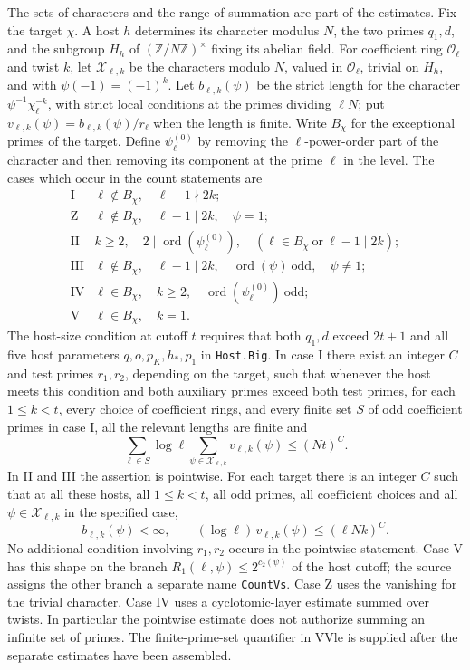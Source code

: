The sets of characters and the range of summation are part of the
estimates. Fix the target \(\chi\). A host \(h\) determines its character
modulus \(N\), the two primes \(q_1,d\), and the subgroup \(H_h\) of
\((\mathbb Z/N\mathbb Z)^\times\) fixing its abelian field.
For coefficient ring \(\mathcal O_\ell\) and twist \(k\), let
\(\mathcal X_{\ell,k}\) be the characters modulo \(N\), valued in
\(\mathcal O_\ell\), trivial on \(H_h\), and with
\(\psi(-1)=(-1)^k\). Let \(b_{\ell,k}(\psi)\) be the strict length for
the character \(\psi^{-1}\chi_\ell^{-k}\), with strict local conditions
at the primes dividing \(\ell N\); put
\(v_{\ell,k}(\psi)=b_{\ell,k}(\psi)/r_\ell\) when the length is finite.
Write \(B_\chi\) for the exceptional primes of the target. Define
\(\psi^{(0)}_\ell\) by removing the \(\ell\)-power-order part of the
character and then removing its component at the prime \(\ell\) in
the level. The cases which occur in the count statements are
\[
\begin{array}{cl}
\mathrm I&
 \ell\notin B_\chi,\quad \ell-1\nmid 2k;\\
\mathrm Z&
 \ell\notin B_\chi,\quad\ell-1\mid 2k,\quad\psi=1;\\
\mathrm {II}&
 k\ge2,\quad 2\mid\operatorname{ord}(\psi_\ell^{(0)}),\quad
    (\ell\in B_\chi\ \text{or}\ \ell-1\mid 2k);\\
\mathrm {III}&
 \ell\notin B_\chi,\quad\ell-1\mid 2k,\quad
   \operatorname{ord}(\psi)\ \text{odd},\quad\psi\ne1;\\
\mathrm {IV}&
 \ell\in B_\chi,\quad k\ge2,\quad
   \operatorname{ord}(\psi_\ell^{(0)})\ \text{odd};\\
\mathrm {V}&\ell\in B_\chi,\quad k=1.
\end{array}
\]
The host-size condition at cutoff \(t\) requires that both \(q_1,d\)
exceed \(2t+1\) and all five host parameters \(q,o,p_K,h_*,p_1\)
in \texttt{Host.\allowbreak{}Big}. In case I there exist an integer \(C\) and test
primes \(r_1,r_2\), depending on the target, such that whenever the
host meets this condition and both auxiliary primes exceed both test
primes, for each \(1\le k<t\), every choice of coefficient rings,
and every finite set \(S\) of odd coefficient primes in case I,
all the relevant lengths are finite and
\[
     \sum_{\ell\in S}\log\ell
             \sum_{\psi\in\mathcal X_{\ell,k}}v_{\ell,k}(\psi)
            \le (Nt)^C .
\]
In II and III the assertion is pointwise. For each target there is an
integer \(C\) such that at all these hosts, all \(1\le k<t\),
all odd primes, all coefficient choices and all
\(\psi\in\mathcal X_{\ell,k}\) in the specified case,
\[
      b_{\ell,k}(\psi)<\infty,\qquad
      (\log\ell)\,v_{\ell,k}(\psi)\le(\ell Nk)^C .
\]
No additional condition involving \(r_1,r_2\) occurs in the pointwise
statement. Case V has this shape on the branch
\(R_1(\ell,\psi)\le 2^{c_2(\psi)}\) of the host cutoff; the source
assigns the other branch a separate name \texttt{Count\allowbreak{}Vs}. Case Z
uses the vanishing for the trivial character. Case IV uses a
cyclotomic-layer estimate summed over twists. In particular the
pointwise estimate does not authorize summing an infinite set of primes.
The finite-prime-set quantifier in \(\mathrm{VVle}\) is supplied after
the separate estimates have been assembled.

